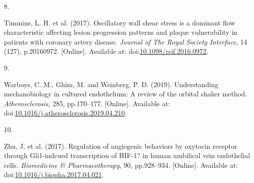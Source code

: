 \documentclass[
  12pt,
]{article}
\newlength{\cslhangindent}
\newlength{\csllabelwidth}
\newlength{\cslentryspacingunit} %
\newenvironment{CSLReferences}[2] %
 {%
  \setlength{\parindent}{0pt}
  \ifodd #1
  \let\oldpar\par
  \def\par{\hangindent=\cslhangindent\oldpar}
  \fi
  \setlength{\parskip}{#2\cslentryspacingunit}
 }%
 {}
\newcommand{\CSLLeftMargin}[1]{\parbox[t]{\csllabelwidth}{#1}}
\newcommand{\CSLRightInline}[1]{\parbox[t]{\linewidth - \csllabelwidth}{#1}\break}
\begin{document}
\begin{CSLReferences}{0}{0}
\leavevmode{}%
\CSLLeftMargin{8. }
\CSLRightInline{Timmins, L. H. {et al.} (2017). {Oscillatory wall shear stress is a dominant flow characteristic affecting lesion progression patterns and plaque vulnerability in patients with coronary artery disease}. \emph{Journal of The Royal Society Interface}, 14 (127), p.20160972. {[}Online{]}. Available at: doi:\href{https://doi.org/10.1098/rsif.2016.0972}{10.1098/rsif.2016.0972}.}

\leavevmode{}%
\CSLLeftMargin{9. }
\CSLRightInline{Warboys, C. M., Ghim, M. and Weinberg, P. D. (2019). {Understanding mechanobiology in cultured endothelium: A review of the orbital shaker method}. \emph{Atherosclerosis}, 285, pp.170--177. {[}Online{]}. Available at: doi:\href{https://doi.org/10.1016/j.atherosclerosis.2019.04.210}{10.1016/j.atherosclerosis.2019.04.210}.}

\leavevmode{}%
\CSLLeftMargin{10. }
\CSLRightInline{Zhu, J. {et al.} (2017). {Regulation of angiogenic behaviors by oxytocin receptor through Gli1-indcued transcription of HIF-1? in human umbilical vein endothelial cells}. \emph{Biomedicine \& Pharmacotherapy}, 90, pp.928--934. {[}Online{]}. Available at: doi:\href{https://doi.org/10.1016/j.biopha.2017.04.021}{10.1016/j.biopha.2017.04.021}.}

\end{CSLReferences}
\end{document}
